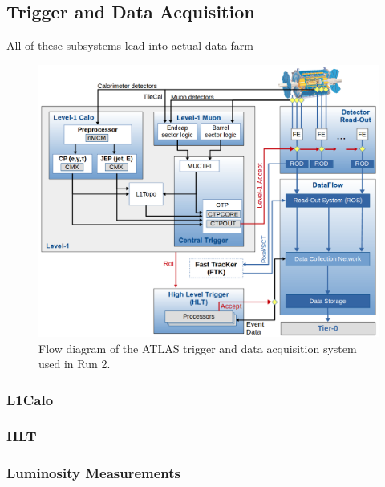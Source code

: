 \subsection{Trigger and Data Acquisition}
All of these subsystems lead into actual data farm
\begin{figure}[h!]
	\centering
	\includegraphics[width=\columnwidth]{../ThesisImages/LHCImages/ATLASTDAQR2.png}
	\caption[Flow diagram of the ATLAS trigger and data acquisition system used in Run 2.]{Flow diagram of the ATLAS trigger and data acquisition system used in Run 2.\cite{ATLASTDAQ}
	}
	\label{fig:ATLAStdaq}
\end{figure}

\subsubsection{L1Calo}
\subsubsection{HLT}
\subsubsection{Luminosity Measurements}

